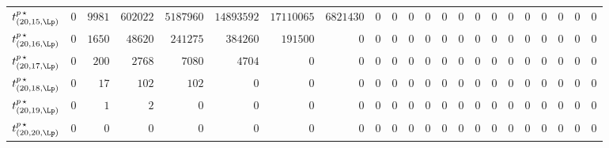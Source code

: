 \begin{tabular}{r|rrrrrrrrrrrrrrrrrrrrr}
  $t^{p \, \star}_{(20,15,\Lp)}$ & $0$ & $9981$ & $602022$ & $5187960$ & $14893592$ & $17110065$ & $6821430$ & $0$ & $0$ & $0$ & $0$ & $0$ & $0$ & $0$ & $0$ & $0$ & $0$ & $0$ & $0$ & $0$ & $0$ \\
  $t^{p \, \star}_{(20,16,\Lp)}$ & $0$ & $1650$ & $48620$ & $241275$ & $384260$ & $191500$ & $0$ & $0$ & $0$ & $0$ & $0$ & $0$ & $0$ & $0$ & $0$ & $0$ & $0$ & $0$ & $0$ & $0$ & $0$ \\
  $t^{p \, \star}_{(20,17,\Lp)}$ & $0$ & $200$ & $2768$ & $7080$ & $4704$ & $0$ & $0$ & $0$ & $0$ & $0$ & $0$ & $0$ & $0$ & $0$ & $0$ & $0$ & $0$ & $0$ & $0$ & $0$ & $0$ \\
  $t^{p \, \star}_{(20,18,\Lp)}$ & $0$ & $17$ & $102$ & $102$ & $0$ & $0$ & $0$ & $0$ & $0$ & $0$ & $0$ & $0$ & $0$ & $0$ & $0$ & $0$ & $0$ & $0$ & $0$ & $0$ & $0$ \\
  $t^{p \, \star}_{(20,19,\Lp)}$ & $0$ & $1$ & $2$ & $0$ & $0$ & $0$ & $0$ & $0$ & $0$ & $0$ & $0$ & $0$ & $0$ & $0$ & $0$ & $0$ & $0$ & $0$ & $0$ & $0$ & $0$ \\
  $t^{p \, \star}_{(20,20,\Lp)}$ & $0$ & $0$ & $0$ & $0$ & $0$ & $0$ & $0$ & $0$ & $0$ & $0$ & $0$ & $0$ & $0$ & $0$ & $0$ & $0$ & $0$ & $0$ & $0$ & $0$ & $0$ \\
\end{tabular}
